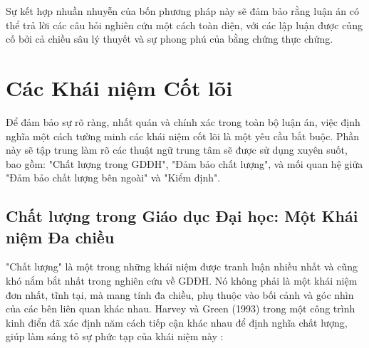 \documentclass[12pt, a4paper, openany]{report}
\begin{document}
Sự kết hợp nhuần nhuyễn của bốn phương pháp này sẽ đảm bảo rằng luận án có thể trả lời các câu hỏi nghiên cứu một cách toàn diện, với các lập luận được củng cố bởi cả chiều sâu lý thuyết và sự phong phú của bằng chứng thực chứng.


\section{Các Khái niệm Cốt lõi}
\label{sec:khai_niem_cot_loi}

Để đảm bảo sự rõ ràng, nhất quán và chính xác trong toàn bộ luận án, việc định nghĩa một cách tường minh các khái niệm cốt lõi là một yêu cầu bắt buộc. Phần này sẽ tập trung làm rõ các thuật ngữ trung tâm sẽ được sử dụng xuyên suốt, bao gồm: "Chất lượng trong GDĐH", "Đảm bảo chất lượng", và mối quan hệ giữa "Đảm bảo chất lượng bên ngoài" và "Kiểm định".

\subsection{Chất lượng trong Giáo dục Đại học: Một Khái niệm Đa chiều}
\label{subsec:khai_niem_chat_luong}

"Chất lượng" là một trong những khái niệm được tranh luận nhiều nhất và cũng khó nắm bắt nhất trong nghiên cứu về GDĐH. Nó không phải là một khái niệm đơn nhất, tĩnh tại, mà mang tính đa chiều, phụ thuộc vào bối cảnh và góc nhìn của các bên liên quan khác nhau. Harvey và Green (1993) trong một công trình kinh điển đã xác định năm cách tiếp cận khác nhau để định nghĩa chất lượng, giúp làm sáng tỏ sự phức tạp của khái niệm này \cite{HarveyGreen1993}:
\end{document}
